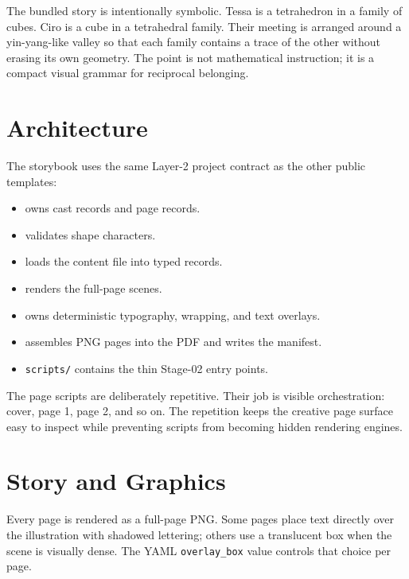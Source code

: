 \documentclass[
  english,
]{article}
\providecommand{\tightlist}{%
  \setlength{\itemsep}{0pt}\setlength{\parskip}{0pt}}
\begin{document}
The bundled story is intentionally symbolic. Tessa is a tetrahedron in a
family of cubes. Ciro is a cube in a tetrahedral family. Their meeting
is arranged around a yin-yang-like valley so that each family contains a
trace of the other without erasing its own geometry. The point is not
mathematical instruction; it is a compact visual grammar for reciprocal
belonging.

\newpage

\section{Architecture}\label{architecture}

The storybook uses the same Layer-2 project contract as the other public
templates:

\begin{itemize}
\tightlist
\item
   owns cast records and page records.
\item
   validates shape characters.
\item
   loads the content file into typed
  records.
\item
   renders the full-page scenes.
\item
   owns deterministic typography,
  wrapping, and text overlays.
\item
   assembles PNG pages into the PDF
  and writes the manifest.
\item
  \texttt{scripts/} contains the thin Stage-02 entry points.
\end{itemize}

The page scripts are deliberately repetitive. Their job is visible
orchestration: cover, page 1, page 2, and so on. The repetition keeps
the creative page surface easy to inspect while preventing scripts from
becoming hidden rendering engines.

\newpage

\section{Story and Graphics}\label{story-and-graphics}

Every page is rendered as a full-page PNG. Some pages place text
directly over the illustration with shadowed lettering; others use a
translucent box when the scene is visually dense. The YAML
\texttt{overlay\_box} value controls that choice per page.
\end{document}
